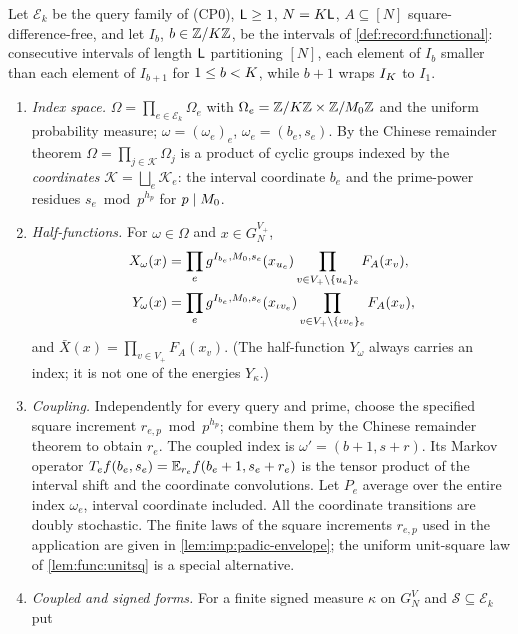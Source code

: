 \begin{definition}\label{def:hyb:coupled}
Let $\mathcal E_k$ be the query family of (CP0), $\mathsf L\ge1$, $N=K\mathsf L$,
$A\subseteq[N]$ square-difference-free, and let $I_b$, $b\in\mathbb Z/K\mathbb Z$, be
the intervals of \cref{def:record:functional}: consecutive intervals of
length $\mathsf L$ partitioning $[N]$, each element of $I_b$ smaller than each
element of $I_{b+1}$ for $1\le b<K$, while $b+1$ wraps $I_{K}$ to
$I_1$.
\begin{enumerate}[label=(\alph*)]
\item\emph{Index space.} $\Omega=\prod_{e\in\mathcal E_k}\Omega_e$ with
 $\Omega_e=\mathbb Z/K\mathbb Z\times\mathbb Z/M_0\mathbb Z$ and the uniform probability measure;
 $\omega=(\omega_e)_e$, $\omega_e=(b_e,s_e)$. By the Chinese remainder theorem
 $\Omega=\prod_{j\in\mathcal K}\Omega_j$ is a product of cyclic groups indexed
 by the \emph{coordinates} $\mathcal K=\bigsqcup_e\mathcal K_e$: the interval
 coordinate $b_e$ and the prime-power residues
 $s_e\bmod p^{h_p}$ for $p\mid M_0$.
\item\emph{Half-functions.} For $\omega\in\Omega$ and $x\in G_N^{V_+}$,
 \begin{align*}
  X_\omega(x)&=\prod_{e}g^{I_{b_e},M_0,s_e}(x_{u_e})
  \prod_{v\in V_+\setminus\{u_e\}_e}F_A(x_v),\\
  Y_\omega(x)&=\prod_{e}g^{I_{b_e},M_0,s_e}(x_{\iota v_e})
  \prod_{v\in V_+\setminus\{\iota v_e\}_e}F_A(x_v),
 \end{align*}
 and $\bar X(x)=\prod_{v\in V_+}F_A(x_v)$. (The half-function $Y_\omega$ always
 carries an index; it is not one of the energies $Y_\kappa$.)
\item\emph{Coupling.} Independently for every query and prime, choose
 the specified square increment $r_{e,p}\bmod p^{h_p}$; combine them by
 the Chinese remainder theorem to obtain $r_e$. The coupled index is
 $\omega'=(b+1,s+r)$. Its Markov operator
 $T_ef(b_e,s_e)=\mathbb E_{r_e}f(b_e+1,s_e+r_e)$ is the tensor product of the
 interval shift and the coordinate convolutions. Let $P_e$ average over
 the entire index $\omega_e$, interval coordinate included. All the
 coordinate transitions are doubly stochastic. The finite laws of the
 square increments $r_{e,p}$ used in the application are given in
 \cref{lem:imp:padic-envelope}; the uniform
 unit-square law of \cref{lem:func:unitsq} is a special alternative.
\item\emph{Coupled and signed forms.} For a finite signed measure $\kappa$ on
 $G_N^V$ and $\mathcal S\subseteq\mathcal E_k$ put

\end{enumerate}
\end{definition}
